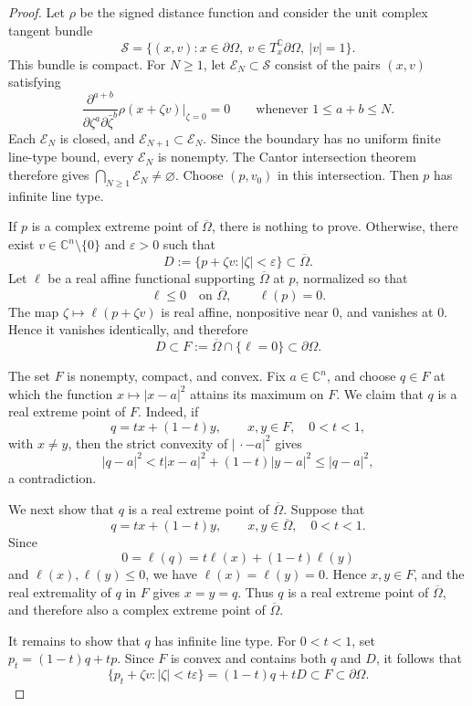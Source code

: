 \documentclass[11pt]{article}
\theoremstyle{definition}
\newcommand{\C}{\mathbb{C}}
\newcommand{\eps}{\varepsilon}
\begin{document}
\begin{proof}
Let \(\rho\) be the signed distance function and consider the unit complex tangent bundle
\[
\mathcal S
=
\{(x,v):x\in\partial\Omega,\ v\in T_x^{\C}\partial\Omega,\ |v|=1\}.
\]
This bundle is compact.  For \(N\ge1\), let
\(\mathcal E_N\subset\mathcal S\) consist of the pairs \((x,v)\) satisfying
\[
\frac{\partial^{a+b}}
{\partial\zeta^a\partial\bar\zeta^b}
\rho(x+\zeta v)\bigg|_{\zeta=0}=0
\qquad
\text{whenever }1\le a+b\le N.
\]
Each \(\mathcal E_N\) is closed, and
\(\mathcal E_{N+1}\subset\mathcal E_N\).  Since the boundary has no
uniform finite line-type bound, every \(\mathcal E_N\) is nonempty. The Cantor intersection theorem therefore gives
\(\bigcap_{N\ge1}\mathcal E_N\ne\varnothing\).  Choose
\((p,v_0)\) in this intersection.  Then \(p\) has infinite line type.

If \(p\) is a complex extreme point of \(\overline\Omega\), there is
nothing to prove.  Otherwise, there exist
\(v\in\C^n\setminus\{0\}\) and \(\eps>0\)
	such that
	\[
	D:=\{p+\zeta v:|\zeta|<\eps\}\subset\overline\Omega.
	\]
	Let \(\ell\) be a real affine functional supporting
	\(\overline\Omega\) at \(p\), normalized so that
	\[
	\ell\le0\quad\text{on }\overline\Omega,
	\qquad
	\ell(p)=0.
	\]
	The map
	\(\zeta\longmapsto \ell(p+\zeta v)\)
	is real affine, nonpositive near \(0\), and vanishes at \(0\).  Hence it
	vanishes identically, and therefore
	\[
	D\subset
	F:=\overline\Omega\cap\{\ell=0\}
	\subset\partial\Omega.
	\]
	
	The set \(F\) is nonempty, compact, and convex.  Fix \(a\in\C^n\), and
	choose \(q\in F\) at which the function \(x\mapsto|x-a|^2\) attains its
	maximum on \(F\).  We claim that \(q\) is a real extreme point of \(F\).
	Indeed, if
	\[
	q=tx+(1-t)y,
	\qquad
	x,y\in F,\quad 0<t<1,
	\]
	with \(x\ne y\), then the strict convexity of \(|\,\cdot-a|^2\) gives
	\[
	|q-a|^2
	<
	t|x-a|^2+(1-t)|y-a|^2
	\le
	|q-a|^2,
	\]
	a contradiction.
	
	We next show that \(q\) is a real extreme point of
	\(\overline\Omega\).  Suppose that
	\[
	q=tx+(1-t)y,
	\qquad
	x,y\in\overline\Omega,\quad 0<t<1.
	\]
	Since
	\[
	0=\ell(q)=t\ell(x)+(1-t)\ell(y)
	\]
	and \(\ell(x),\ell(y)\le0\), we have
	\(\ell(x)=\ell(y)=0\).  Hence \(x,y\in F\), and the real extremality of
	\(q\) in \(F\) gives \(x=y=q\).  Thus \(q\) is a real extreme point of
	\(\overline\Omega\), and therefore also a complex extreme point of
	\(\overline\Omega\).
	
	It remains to show that \(q\) has infinite line type.  For \(0<t<1\),
	set
	\(p_t=(1-t)q+tp\).
	Since \(F\) is convex and contains both \(q\) and \(D\), it follows that
	\[
	\{p_t+\zeta v:|\zeta|<t\eps\}
	=
	(1-t)q+tD
	\subset F
	\subset\partial\Omega.
	\]
	

\end{proof}
\end{document}
